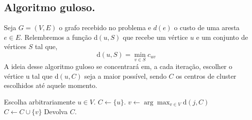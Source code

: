 \documentclass[12pt]{article}
\begin{document}
\newpage
\subsection{Algoritmo guloso.}
    Seja $G = (V,E)$ o grafo recebido no problema e $d(e)$ o custo de uma aresta $e \in E$.
    Relembremos a função d$(u,S)$ que recebe um vértice $u$ e um conjunto de vértices $S$ tal que,
    \[ \text{d}(u,S) = \min_{v\in S} c_{uv}
        \]
    A ideia desse algoritmo guloso se concentrará em, a cada iteração, escolher o vértice u tal que d$(u,C)$ seja a maior possível, sendo $C$ os centros de cluster escolhidos até aquele momento.

    \begin{algorithm}
		\begin{algorithmic}[1]
			\State Escolha arbitrariamente $u \in V$.
            \State $C \gets \{u\}$.
            \State $v \gets \arg\max_{v \in V} \text{d}(j,C)$
            \State $C \gets C \cup \{v\}$
            \EndWhile 
			\State Devolva $C$.
			\EndFunction
		\end{algorithmic}
	\end{algorithm}
    
\end{document}
